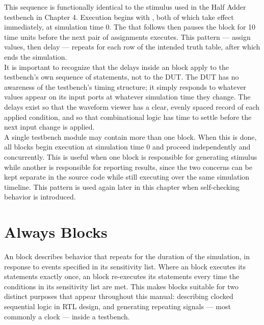 
This sequence is functionally identical to the stimulus used in the Half Adder testbench in Chapter 4. Execution begins with , both of which take effect immediately, at simulation time 0. The  that follows then pauses the block for 10 time units before the next pair of assignments executes. This pattern — assign values, then delay — repeats for each row of the intended truth table, after which  ends the simulation.\\

It is important to recognize that the delays inside an  block apply to the testbench's own sequence of statements, not to the DUT. The DUT has no awareness of the testbench's timing structure; it simply responds to whatever values appear on its input ports at whatever simulation time they change. The delays exist so that the waveform viewer has a clear, evenly spaced record of each applied condition, and so that combinational logic has time to settle before the next input change is applied.\\


A single testbench module may contain more than one  block. When this is done, all  blocks begin execution at simulation time 0 and proceed independently and concurrently. This is useful when one block is responsible for generating stimulus while another is responsible for reporting results, since the two concerns can be kept separate in the source code while still executing over the same simulation timeline. This pattern is used again later in this chapter when self-checking behavior is introduced.

\section{Always Blocks}
An  block describes behavior that repeats for the duration of the simulation, in response to events specified in its sensitivity list. Where an  block executes its statements exactly once, an  block re-executes its statements every time the conditions in its sensitivity list are met. This makes  blocks suitable for two distinct purposes that appear throughout this manual: describing clocked sequential logic in RTL design, and generating repeating signals — most commonly a clock — inside a testbench. \\

